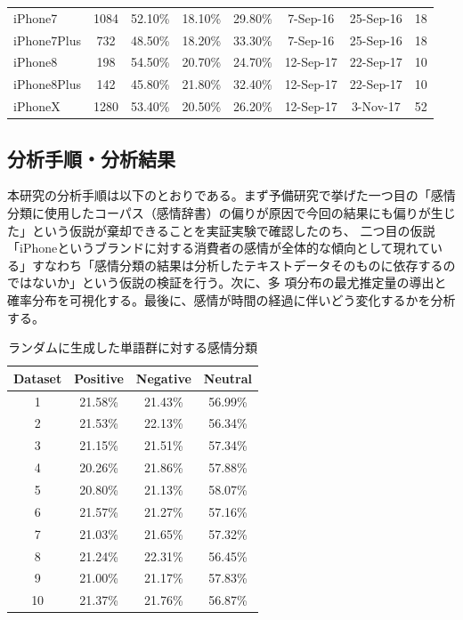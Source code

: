 \documentclass[uplatex,11pt]{jsarticle}
\begin{document}
\begin{table}
\begin{center}
{\begin{tabular}{|l|ccccccc|}
                iPhone7      & 1084     & 52.10\%        & 18.10\%        & 29.80\%       & 7-Sep-16  & 25-Sep-16 & 18     \\
                iPhone7Plus  & 732      & 48.50\%        & 18.20\%        & 33.30\%       & 7-Sep-16  & 25-Sep-16 & 18     \\
                iPhone8      & 198      & 54.50\%        & 20.70\%        & 24.70\%       & 12-Sep-17 & 22-Sep-17 & 10     \\
                iPhone8Plus  & 142      & 45.80\%        & 21.80\%        & 32.40\%       & 12-Sep-17 & 22-Sep-17 & 10     \\
                iPhoneX      & 1280     & 53.40\%        & 20.50\%        & 26.20\%       & 12-Sep-17 & 3-Nov-17  & 52     \\ \hline
            \end{tabular}
        }
    \end{center}
\end{table}
\subsection{分析手順・分析結果}
本研究の分析手順は以下のとおりである。まず予備研究で挙げた一つ目の「感情分類に使用したコーパス（感情辞書）の偏りが原因で今回の結果にも偏りが生じた」という仮説が棄却できることを実証実験で確認したのち、
二つ目の仮説「iPhoneというブランドに対する消費者の感情が全体的な傾向として現れている」すなわち「感情分類の結果は分析したテキストデータそのものに依存するのではないか」という仮説の検証を行う。次に、多
項分布の最尤推定量の導出と確率分布を可視化する。最後に、感情が時間の経過に伴いどう変化するかを分析する。
\begin{table}[htbp]
    \begin{center}
        \caption{ランダムに生成した単語群に対する感情分類}
        \begin{tabular}{|c|ccc|}
            \hline
            Dataset & Positive & Negative & Neutral \\ \hline
            1  & 21.58\%  & 21.43\%  & 56.99\% \\
            2  & 21.53\%  & 22.13\%  & 56.34\% \\
            3  & 21.15\%  & 21.51\%  & 57.34\% \\
            4  & 20.26\%  & 21.86\%  & 57.88\% \\
            5  & 20.80\%  & 21.13\%  & 58.07\% \\
            6  & 21.57\%  & 21.27\%  & 57.16\% \\
            7  & 21.03\%  & 21.65\%  & 57.32\% \\
            8  & 21.24\%  & 22.31\%  & 56.45\% \\
            9  & 21.00\%  & 21.17\%  & 57.83\% \\
            10 & 21.37\%  & 21.76\%  & 56.87\% \\ \hline
        \end{tabular}
    \end{center}
\end{table}
\end{document}
